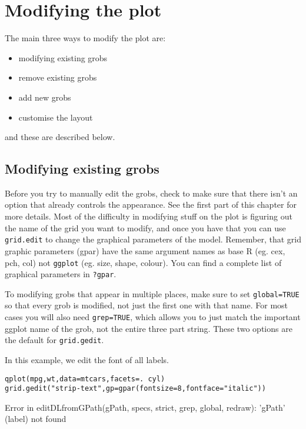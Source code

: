\newpage
\section{Modifying the plot}

The main three ways to modify the plot are:

\begin{itemize}
  \item modifying existing grobs
  \item remove existing grobs
  \item add new grobs
  \item customise the layout
\end{itemize}

\noindent and these are described below.

\subsection{Modifying existing grobs}\label{sec:modifying_stuff}

Before you try to manually edit the grobs, check to make sure that there isn't an option that already controls the appearance.  See the first part of this chapter for more details.  Most of the difficulty in modifying stuff on the plot is figuring out the name of the grid you want to modify, and once you have that you can use  {\tt grid.edit} to change the graphical parameters of the model.  Remember, that grid graphic parameters (gpar) have the same argument names as base R (eg. cex, pch, col) not {\tt ggplot} (eg. size, shape, colour).  You can find a complete list of graphical parameters in {\tt ?gpar}.

To modifying grobs that appear in multiple places, make sure to set {\tt global=TRUE} so that every grob is modified, not just the first one with that name.  For most cases you will also need {\tt grep=TRUE}, which allows you to just match the important ggplot name of the grob, not the entire three part string.  These two options are the default for {\tt grid.gedit}.

In this example, we edit the font of all labels.

\begin{alltt}
qplot(mpg, wt, data=mtcars, facets = . ~ cyl)
grid.gedit("strip-text", gp=gpar(fontsize=8, fontface="italic"))
\end{alltt}

Error in editDLfromGPath(gPath, specs, strict, grep, global, redraw): 'gPath' (label) not found \\ 

